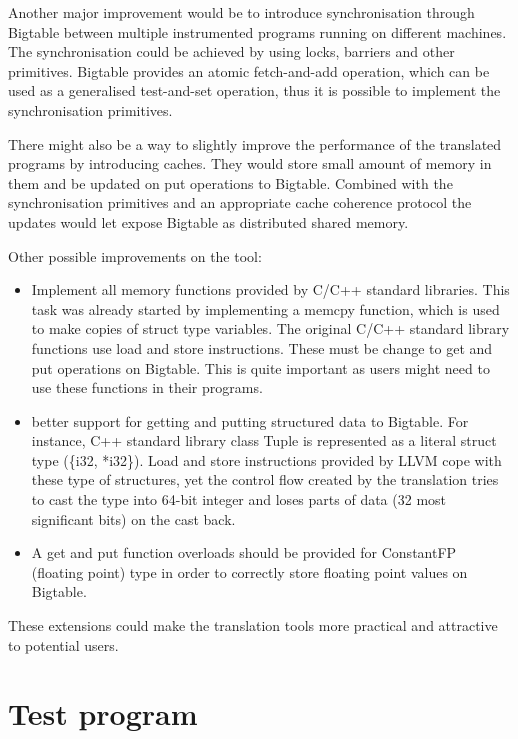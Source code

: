 \documentclass[bsc,frontabs,twoside,singlespacing,parskip,deptreport]{infthesis}     %
\begin{document}
Another major improvement would be to introduce synchronisation through Bigtable between multiple instrumented programs running on different machines. The synchronisation could be achieved by using locks, barriers and other primitives. Bigtable provides an atomic fetch-and-add operation, which can be used as a generalised test-and-set operation, thus it is possible to implement the synchronisation primitives.

There might also be a way to slightly improve the performance of the translated programs by introducing caches. They would store small amount of memory in them and be updated on put operations to Bigtable. Combined with the synchronisation primitives and an appropriate cache coherence protocol the updates would let expose Bigtable as distributed shared memory.

Other possible improvements on the tool:
\begin{itemize}
\item
Implement all memory functions provided by C/C++ standard libraries. This task was already started by implementing a memcpy function, which is used to make copies of struct type variables. The original C/C++ standard library functions use load and store instructions. These must be change to get and put operations on Bigtable. This is quite important as users might need to use these functions in their programs.
\item
better support for getting and putting structured data to Bigtable. For instance, C++ standard library class Tuple is represented as a literal struct type (\{i32, *i32\}). Load and store instructions provided by LLVM cope with these type of structures, yet the control flow created by the translation tries to cast the type into 64-bit integer and loses parts of data (32 most significant bits) on the cast back. 
\item
A get and put function overloads should be provided for ConstantFP (floating point) type in order to correctly store floating point values on Bigtable.
\end{itemize}

These extensions could make the translation tools more practical and attractive to potential users.




\appendix
\chapter{Test program}
\label{section:test}
\end{document}
